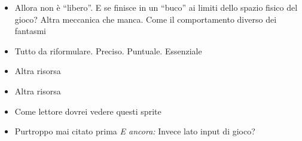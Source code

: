 {\begin{itemize}
  \item {} Allora non è ``libero''. E se finisce in un ``buco'' ai limiti dello spazio fisico del gioco? Altra meccanica che manca. Come il comportamento diverso dei fantasmi
  \item {} Tutto da riformulare. Preciso. Puntuale. Essenziale
  \item {} Altra risorsa
  \item {} Altra risorsa
  \item {} Come lettore dovrei vedere questi sprite
  \item {} Purtroppo mai citato prima \emph{E ancora:} Invece lato input di gioco?
\end{itemize}
}


